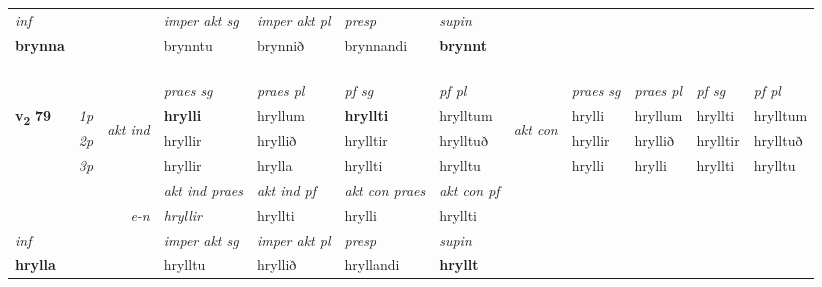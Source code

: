 \begin{longtable}[l]{X>{\footnotesize\itshape}llXXXXlXXXX}
   {\textit{inf}} & &  & \textit{imper akt sg} & \textit{imper akt pl}   & \textit{presp} & \textit{supin}   \\*
  {\textbf{brynna}} & && brynntu  & brynnið   & brynnandi &  \textbf{brynnt}   \\*

\midrule
 & \\*
  & \\*
   & \\*
  & \\
   \midrule
 & &   & \textit{praes sg}  & \textit{praes pl}    & \textit{ pf sg} & \textit{pf pl} & & \textit{praes sg}  & \textit{praes pl}    & \textit{pf sg} & \textit{pf pl }  \\ \cmidrule{4-7} \cmidrule{9-12}
 \multirow{2}{*}{{{\textbf{v{\textsubscript{2}}} \Large{\textbf{79}}}}}  & 1p & \multirow{3}{*}{\begin{turn}{90}\textit{akt ind}\end{turn}} & \textbf{hrylli} & hryllum & \textbf{hryllti} & hrylltum & \multirow{3}{*}{\begin{turn}{90}\textit{akt con}\end{turn}} &hrylli & hryllum & hryllti & hrylltum\\*
 & 2p &  &  hryllir  & hryllið & hrylltir & hrylltuð & & hryllir & hryllið & hrylltir & hrylltuð \\*
 & 3p &  & hryllir & hrylla & hryllti & hrylltu & & hrylli & hrylli& hryllti & hrylltu \\*
\cmidrule{4-7} \cmidrule{9-12}

   && &  \textit{akt ind praes} & \textit{akt ind pf} & \textit{akt con praes} & \textit{akt con pf} \\*
\multicolumn{3}{r}{\textit{e-n}} & hryllir & hryllti & hrylli & hryllti \\*

\cmidrule{4-7}
   {\textit{inf}} & &  & \textit{imper akt sg} & \textit{imper akt pl}   & \textit{presp} & \textit{supin}   \\*
  {\textbf{hrylla}} & && hrylltu  & hryllið   & hryllandi &  \textbf{hryllt}   \\*

\midrule


\end{longtable}

